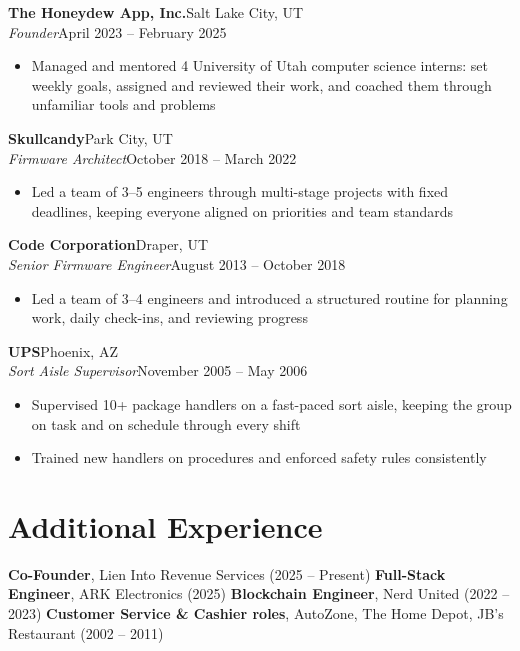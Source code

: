 \documentclass[10.5pt, letterpaper]{article}
\newcommand{\jobentry}[4]{%
  \noindent
  \textbf{\color{accent}#1}\hfill\textcolor{muted}{\small #2}\\
  \textit{#3}\hfill\textcolor{muted}{\small #4}%
}
\begin{document}
\vspace{5pt}

\jobentry{The Honeydew App, Inc.}{Salt Lake City, UT}{Founder}{April 2023 -- February 2025}
\begin{itemize}
  \item Managed and mentored 4 University of Utah computer science interns: set
        weekly goals, assigned and reviewed their work, and coached them through
        unfamiliar tools and problems
\end{itemize}

\vspace{5pt}

\jobentry{Skullcandy}{Park City, UT}{Firmware Architect}{October 2018 -- March 2022}
\begin{itemize}
  \item Led a team of 3--5 engineers through multi-stage projects with fixed
        deadlines, keeping everyone aligned on priorities and team standards
\end{itemize}

\vspace{5pt}

\jobentry{Code Corporation}{Draper, UT}{Senior Firmware Engineer}{August 2013 -- October 2018}
\begin{itemize}
  \item Led a team of 3--4 engineers and introduced a structured routine for
        planning work, daily check-ins, and reviewing progress
\end{itemize}

\vspace{5pt}

\jobentry{UPS}{Phoenix, AZ}{Sort Aisle Supervisor}{November 2005 -- May 2006}
\begin{itemize}
  \item Supervised 10+ package handlers on a fast-paced sort aisle, keeping the group
        on task and on schedule through every shift
  \item Trained new handlers on procedures and enforced safety rules consistently
\end{itemize}

\section{Additional Experience}

\noindent
\textbf{\color{accent}Co-Founder}, Lien Into Revenue Services (2025 -- Present)
\enspace\textbullet\enspace
\textbf{\color{accent}Full-Stack Engineer}, ARK Electronics (2025)
\enspace\textbullet\enspace
\textbf{\color{accent}Blockchain Engineer}, Nerd United (2022 -- 2023)
\enspace\textbullet\enspace
\textbf{\color{accent}Customer Service \& Cashier roles}, AutoZone, The Home Depot,
JB's Restaurant (2002 -- 2011)
\end{document}
